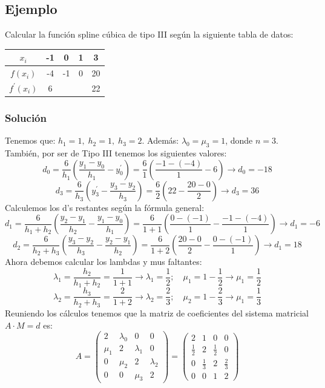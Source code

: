 \documentclass[12pt,a4paper,oneside]{scrbook}
\begin{document}
\subsection*{Ejemplo}
Calcular la función spline cúbica de tipo III según la siguiente tabla de datos:
\begin{center}
    \begin{tabular}{|c||c|c|c|c|}
        \hline
        $x_i$    & -1 & 0 & 1 & 3 \\ \hline
        $f(x_i)$ & -4 & -1 & 0 & 20\\ \hline
        $f^\prime(x_i)$ & 6 &  &  & 22\\ \hline
    \end{tabular}
\end{center}
\subsubsection*{Solución}
Tenemos que: $h_1=1,\; h_2=1,\; h_3=2$. Además: $\lambda_0=\mu_3=1$, donde $n=3$. También, por ser de Tipo III tenemos los siguientes valores:
$$
d_0=\frac{6}{h_1}\left(\dfrac{y_1-y_0}{h_1}-y_0^\prime \right)=\frac{6}{1}\left( \dfrac{-1-(-4)}{1}-6 \right)\rightarrow d_0=-18
$$
$$
d_3=\frac{6}{h_3}\left( y_3^\prime -\dfrac{y_3-y_2}{h_3} \right)=\frac{6}{2}\left( 22-\dfrac{20-0}{2} \right)\rightarrow d_3=36
$$
Calculemos los d's restantes según la fórmula general:
$$
d_1=\frac{6}{h_1+h_2}\left( \dfrac{y_2-y_1}{h_2} -\dfrac{y_1-y_0}{h_1} \right)=\frac{6}{1+1}\left( \dfrac{0-(-1)}{1}-\dfrac{-1-(-4)}{1} \right)\rightarrow d_1=-6
$$
$$
d_2=\frac{6}{h_2+h_3}\left( \dfrac{y_3-y_2}{h_3} -\dfrac{y_2-y_1}{h_2} \right)=\frac{6}{1+2}\left( \dfrac{20-0}{2}-\dfrac{0-(-1)}{1} \right)\rightarrow d_1=18
$$
Ahora debemos calcular los lambdas y mus faltantes:
$$
\lambda_1=\dfrac{h_2}{h_1+h_2}=\dfrac{1}{1+1}\rightarrow \lambda_1=\frac{1}{2};\quad \mu_1=1-\frac{1}{2}\rightarrow\mu_1=\frac{1}{2}
$$
$$
\lambda_2=\dfrac{h_3}{h_2+h_3}=\dfrac{2}{1+2}\rightarrow \lambda_2=\frac{2}{3};\quad \mu_2=1-\frac{2}{3}\rightarrow\mu_1=\frac{1}{3}
$$
Reuniendo los cálculos tenemos que la matriz de coeficientes del sistema matricial $A\cdot M=d$ es:
\[
A=
\begin{pmatrix}
    2 & \lambda_0 & 0 & 0\\
\mu_1 & 2  & \lambda_1 & 0\\
    0 & \mu_2  & 2 & \lambda_2\\
    0 &   0    & \mu_3 & 2
\end{pmatrix} =
\begin{pmatrix}
    2 & 1 & 0 & 0\\
 \frac{1}{2} & 2 & \frac{1}{2} & 0\\
       0     & \frac{1}{3} & 2 & \frac{2}{3}\\
    0 & 0 & 1 & 2
\end{pmatrix}
\]
\end{document}
